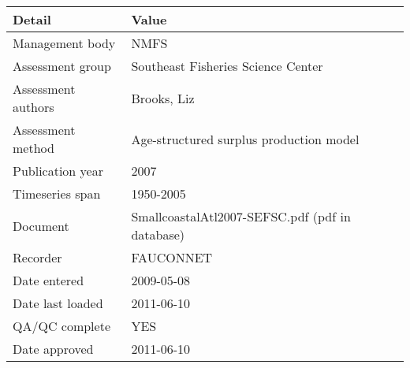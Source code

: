 \begin{table}[htb]
\centering
\begin{tabular}{lp{7cm}}
\toprule
Detail & Value \\
\midrule
Management body    & NMFS                                            \\
Assessment group   & Southeast Fisheries Science Center              \\
Assessment authors & Brooks, Liz                                     \\
Assessment method  & Age-structured surplus production model         \\
Publication year   & 2007                                            \\
Timeseries span    & 1950-2005                                       \\
Document           & SmallcoastalAtl2007-SEFSC.pdf (pdf in database) \\
Recorder           & FAUCONNET                                       \\
Date entered       & 2009-05-08                                      \\
Date last loaded   & 2011-06-10                                      \\
QA/QC complete     & YES                                             \\
Date approved      & 2011-06-10                                      \\
\bottomrule
\end{tabular}
\label{tab:assessdet}
\end{table}
